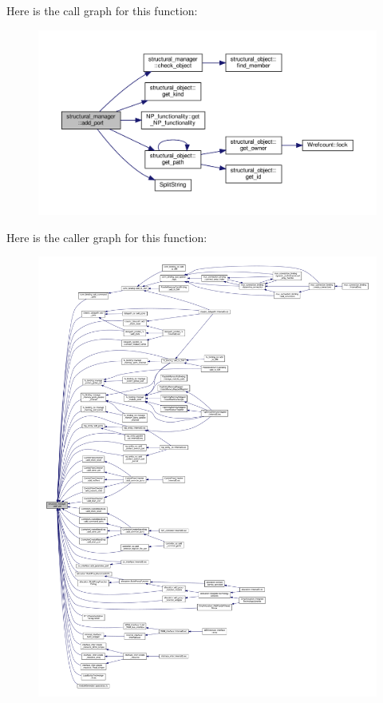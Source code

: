 Here is the call graph for this function\+:
\nopagebreak
\begin{figure}[H]
\begin{center}
\leavevmode
\includegraphics[width=350pt]{d7/d6b/classstructural__manager_a64e0c143cffd76072a1d5b885304a85a_cgraph}
\end{center}
\end{figure}
Here is the caller graph for this function\+:
\nopagebreak
\begin{figure}[H]
\begin{center}
\leavevmode
\includegraphics[width=350pt]{d7/d6b/classstructural__manager_a64e0c143cffd76072a1d5b885304a85a_icgraph}
\end{center}
\end{figure}
\mbox{\label{classstructural__manager_adbb58bf2d0c87da20466cf199a678b5b}} 
